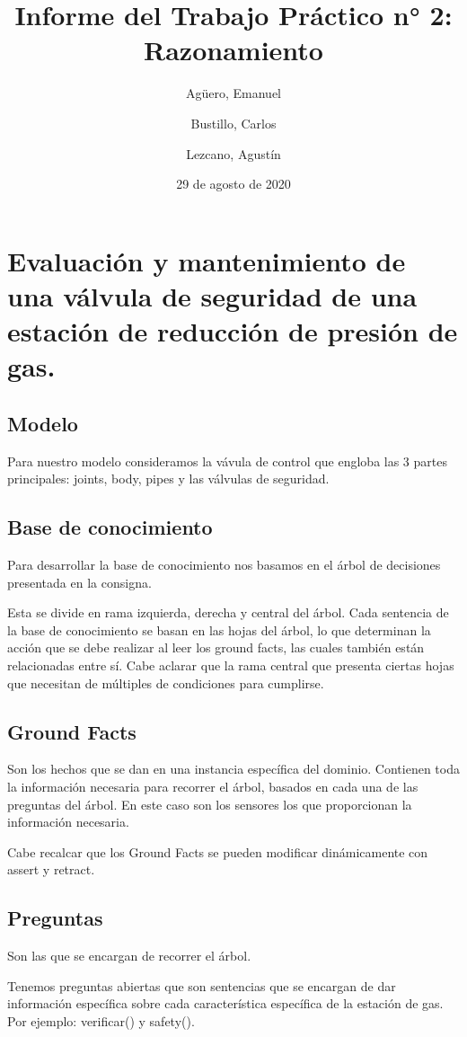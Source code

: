 \documentclass{article}
\title{Informe del Trabajo Práctico n° 2: Razonamiento}
\author{Agüero, Emanuel\\
\and
Bustillo, Carlos\\
\and
Lezcano, Agustín\\
}
\date{29 de agosto de 2020}
\begin{document}
\maketitle

\section{Evaluación y mantenimiento de una válvula de seguridad de una estación de reducción de presión de gas.}

\subsection{Modelo}
    Para nuestro modelo consideramos la vávula de control que engloba las 3 partes principales: joints, body, pipes y las válvulas de seguridad.

\subsection{Base de conocimiento}
    Para desarrollar la base de conocimiento nos basamos en el árbol de decisiones presentada en la consigna.
    
    Esta se divide en rama izquierda, derecha y central del árbol. Cada sentencia de la base de conocimiento se basan en las hojas del árbol, lo que determinan la acción que se debe realizar al leer los ground facts, las cuales también están relacionadas entre sí. Cabe aclarar que la rama central que presenta ciertas hojas que necesitan de múltiples de condiciones para cumplirse. 

\subsection{Ground Facts}
    Son los hechos que se dan en una instancia específica del dominio. Contienen toda la información necesaria para recorrer el árbol, basados en cada una de las preguntas del árbol. En este caso son los sensores los que proporcionan la información necesaria. 
    
    Cabe recalcar que los Ground Facts se pueden modificar dinámicamente con assert y retract.

\subsection{Preguntas}
    Son las que se encargan de recorrer el árbol. 
    
    Tenemos preguntas abiertas que son sentencias que se encargan de dar información específica sobre cada característica específica de la estación de gas. Por ejemplo: verificar() y safety().
\end{document}
